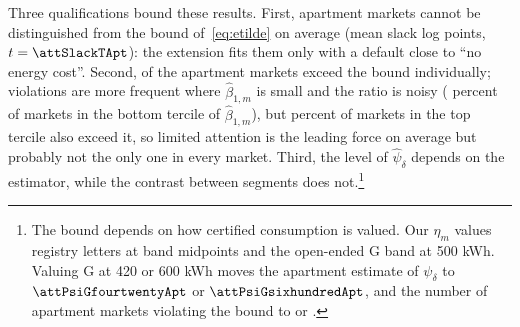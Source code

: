 Three qualifications bound these results. First, apartment markets cannot be distinguished from the bound of~\eqref{eq:etilde} on average (mean slack \attSlackApt{} log points, $t=\attSlackTApt$): the extension fits them only with a default close to ``no energy cost''. Second, \attNViolApt{} of the \attNMarketsApt{} apartment markets exceed the bound individually; violations are more frequent where $\hat\beta_{1,m}$ is small and the ratio is noisy (\attShareViolBottomApt{} percent of markets in the bottom tercile of $\hat\beta_{1,m}$), but \attShareViolTopApt{} percent of markets in the top tercile also exceed it, so limited attention is the leading force on average but probably not the only one in every market. Third, the level of $\hat\psi_\delta$ depends on the estimator, while the contrast between segments does not.\footnote{The bound depends on how certified consumption is valued. Our $\eta_m$ values registry letters at band midpoints and the open-ended G band at 500 kWh. Valuing G at 420 or 600 kWh moves the apartment estimate of $\psi_\delta$ to $\attPsiGfourtwentyApt$ or $\attPsiGsixhundredApt$, and the number of apartment markets violating the bound to \attNViolGfourtwentyApt{} or \attNViolGsixhundredApt. %
}
